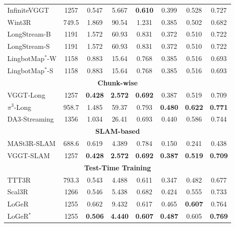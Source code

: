 \begin{table}[t]
{\begin{tabular}{l c >{\columncolor{subcol}}c >{\columncolor{subcol}}c >{\columncolor{subcol}}c >{\columncolor{subcol}}c >{\columncolor{subcol}}c >{\columncolor{subcol}}c}
 InfiniteVGGT & 1257 & 0.547 & 5.667 & \cellcolor{secondorange}\textbf{0.610} & 0.399 & 0.528 & 0.727 \\
 Wint3R & 749.5 & 1.869 & 90.54 & 1.231 & 0.385 & 0.502 & 0.682 \\
 LongStream-B & 1191 & 1.572 & 60.93 & 0.831 & 0.372 & 0.510 & 0.722 \\
 LongStream-S & 1191 & 1.572 & 60.93 & 0.831 & 0.372 & 0.510 & 0.722 \\
 LingbotMap$^{*}$-W & 1158 & 0.883 & 15.64 & 0.768 & 0.385 & 0.516 & 0.693 \\
 LingbotMap$^{*}$-S & 1158 & 0.883 & 15.64 & 0.768 & 0.385 & 0.516 & 0.693 \\
\midrule
\multicolumn{8}{c}{\cellcolor{catgray}\textbf{Chunk-wise}} \\
\midrule
 VGGT-Long & 1257 & \cellcolor{thirdyellow}\textbf{0.428} & \cellcolor{secondorange}\textbf{2.572} & \textbf{0.692} & 0.387 & 0.519 & 0.709 \\
 $\pi^{3}$-Long & 958.7 & 1.485 & 59.37 & 0.793 & \cellcolor{secondorange}\textbf{0.480} & \cellcolor{bestred}\textbf{0.622} & \cellcolor{thirdyellow}\textbf{0.771} \\
 DA3-Streaming & 1356 & 1.034 & 26.41 & 0.693 & 0.440 & 0.586 & 0.744 \\
\midrule
\multicolumn{8}{c}{\cellcolor{catgray}\textbf{SLAM-based}} \\
\midrule
 MASt3R-SLAM & 688.6 & 0.619 & 4.389 & 0.784 & 0.150 & 0.241 & 0.438 \\
 VGGT-SLAM & 1257 & \cellcolor{thirdyellow}\textbf{0.428} & \cellcolor{secondorange}\textbf{2.572} & \textbf{0.692} & \textbf{0.387} & \textbf{0.519} & \textbf{0.709} \\
\midrule
\multicolumn{8}{c}{\cellcolor{catgray}\textbf{Test-Time Training}} \\
\midrule
 TTT3R & 793.3 & 0.543 & 4.488 & 0.611 & 0.347 & 0.482 & 0.677 \\
 Scal3R & 1266 & 0.546 & 5.438 & 0.682 & 0.424 & 0.555 & 0.733 \\
 LoGeR & 1255 & 0.662 & 9.432 & 0.617 & 0.465 & \cellcolor{thirdyellow}\textbf{0.607} & 0.764 \\
 LoGeR$^*$ & 1255 & \textbf{0.506} & \textbf{4.440} & \cellcolor{bestred}\textbf{0.607} & \cellcolor{bestred}\textbf{0.487} & 0.605 & \textbf{0.769} \\
\bottomrule
\end{tabular}%
}
\end{table}
